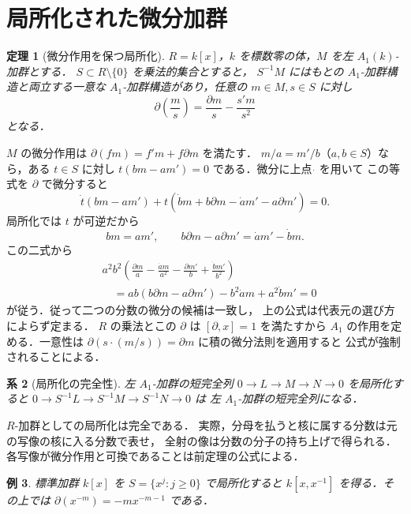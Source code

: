 \documentclass[a5paper,10pt,onecolumn]{jsarticle}
\makeatletter
\theoremstyle{mathnotetheorem}
\newtheorem{theorem}{定理}[section]
\newtheorem{corollary}[theorem]{系}
\newtheorem{example}[theorem]{例}
\renewcommand{\proofname}{証明}
\renewenvironment{proof}[1][\proofname]{%
  \par\pushQED{\qed}\normalfont\topsep4\p@\@plus2\p@\relax
  \trivlist\item[\hskip\labelsep\bfseries #1]\ignorespaces
}{\popQED\endtrivlist\@endpefalse}
\makeatother
\begin{document}
\section{局所化された微分加群}
\begin{theorem}[微分作用を保つ局所化]
$R=k[x]$，$k$ を標数零の体，$M$ を左 $A_1(k)$-加群とする．
$S\subset R\setminus\{0\}$ を乗法的集合とすると，
$S^{-1}M$ にはもとの $A_1$-加群構造と両立する一意な
$A_1$-加群構造があり，任意の $m\in M,s\in S$ に対し
\[
 \partial\left(\frac m s\right)
  =\frac{\partial m}{s}-\frac{s'm}{s^2}
\]
となる．
\end{theorem}
\begin{proof}
$M$ の微分作用は $\partial(fm)=f'm+f\partial m$ を満たす．
$m/a=m'/b$（$a,b\in S$）なら，ある $t\in S$ に対し
$t(bm-am')=0$ である．微分に上点 $\dot{}$ を用いて
この等式を $\partial$ で微分すると
\[
 \dot t(bm-am')+t(\dot b m+b\partial m-\dot a m'-a\partial m')=0.
\]
局所化では $t$ が可逆だから
\[
 bm=am',\qquad
 b\partial m-a\partial m'=\dot a m'-\dot b m.
\]
この二式から
\[
 \begin{aligned}
 &a^2b^2\left(
 \frac{\partial m}{a}-\frac{\dot a m}{a^2}
 -\frac{\partial m'}{b}+\frac{\dot b m'}{b^2}
 \right)\\
 &\quad=ab(b\partial m-a\partial m')
 -b^2\dot a m+a^2\dot b m'=0
 \end{aligned}
\]
が従う．従って二つの分数の微分の候補は一致し，
上の公式は代表元の選び方によらず定まる．
$R$ の乗法とこの $\partial$ は $[\partial,x]=1$ を満たすから
$A_1$ の作用を定める．一意性は
$\partial(s\cdot(m/s))=\partial m$ に積の微分法則を適用すると
公式が強制されることによる．
\end{proof}
\begin{corollary}[局所化の完全性]
左 $A_1$-加群の短完全列 $0\to L\to M\to N\to0$ を局所化すると
$0\to S^{-1}L\to S^{-1}M\to S^{-1}N\to0$ は
左 $A_1$-加群の短完全列になる．
\end{corollary}
\begin{proof}
$R$-加群としての局所化は完全である．
実際，分母を払うと核に属する分数は元の写像の核に入る分数で表せ，
全射の像は分数の分子の持ち上げで得られる．
各写像が微分作用と可換であることは前定理の公式による．
\end{proof}
\begin{example}
標準加群 $k[x]$ を $S=\{x^j:j\ge0\}$ で局所化すると
$k[x,x^{-1}]$ を得る．その上では
$\partial(x^{-m})=-mx^{-m-1}$ である．
\end{example}
\end{document}
